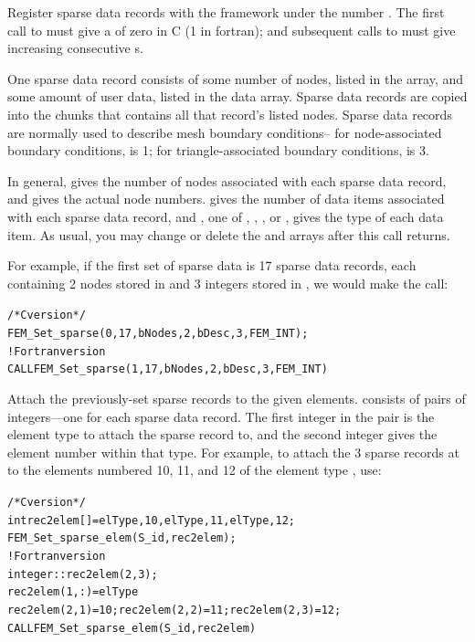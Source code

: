 \documentclass[10pt]{article}
\begin{document}
Register  sparse data records with the framework under the number . 
The first call to  must give a  of zero in C (1 in fortran);
and subsequent calls to  must give increasing consecutive s.

One sparse data record consists of some number of nodes, listed in the
 array, and some amount of user data, listed in the data array.
Sparse data records are copied into the chunks that contains all that record's listed 
nodes.  Sparse data records are normally used to describe mesh boundary conditions--
for node-associated boundary conditions,  is 1; for triangle-associated
boundary conditions,  is 3.

In general,  gives the number of nodes associated with each
sparse data record, and  gives the actual node numbers.
 gives the number of data items associated with each sparse 
data record, and , one of , ,
, or , gives the type of each data item.
As usual, you may change or delete the  and  arrays after this
call returns.

For example, if the first set of sparse data is 17 sparse data records, each 
containing 2 nodes stored in  and 3 integers stored in , 
we would make the call:
\begin{alltt}
/*C version*/
  FEM_Set_sparse(0,17, bNodes,2, bDesc,3,FEM_INT);
! Fortran version
  CALL FEM_Set_sparse(1,17, bNodes,2, bDesc,3,FEM_INT)
\end{alltt}


Attach the previously-set sparse records  to the given elements.
 consists of pairs of integers---one for each sparse data record.
The first integer in the pair is the
element type to attach the sparse record to, and the second integer
gives the element number within that type.  For example, to attach
the 3 sparse records at  to the elements numbered 10, 11, and 12
of the element type , use:

\begin{alltt}
/*C version*/
  int rec2elem[]={elType,10, elType,11, elType,12};
  FEM_Set_sparse_elem(S_id,rec2elem);
! Fortran version
  integer :: rec2elem(2,3);
  rec2elem(1,:)=elType
  rec2elem(2,1)=10; rec2elem(2,2)=11; rec2elem(2,3)=12;
  CALL FEM_Set_sparse_elem(S_id,rec2elem)
\end{alltt}
\end{document}
